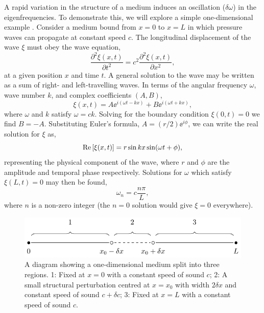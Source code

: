 A rapid variation in the structure of a medium induces an oscillation (\(\delta\omega\)) in the eigenfrequencies. To demonstrate this, we will explore a simple one-dimensional example \citep[e.g][]{Verner2005}. Consider a medium bound from \(x=0\) to \(x=L\) in which pressure waves can propagate at constant speed \(c\). The longitudinal displacement of the wave \(\xi\) must obey the wave equation,
%
\begin{equation}
    \frac{\partial^2\xi(x, t)}{\partial t^2} = c^2 \frac{\partial^2\xi(x, t)}{\partial x^2},
\end{equation}
%
at a given position \(x\) and time \(t\). A general solution to the wave may be written as a sum of right- and left-travelling waves. In terms of the angular frequency \(\omega\), wave number \(k\), and complex coefficients \((A, B)\),
%
\begin{equation}
    \xi(x, t) = A \ee^{i (\omega t - k x)} + B \ee^{i (\omega t + k x)},
\end{equation}
%
where \(\omega\) and \(k\) satisfy \(\omega = c k\). Solving for the boundary condition \(\xi(0, t) = 0\) we find \(B = - A\). Substituting Euler's formula, \(A = (r/2) \ee^{i\phi}\), we can write the real solution for \(\xi\) as,
%
\begin{equation}
    {\mathrm{Re}}\left[\xi(x, t)\right] = r \sin k x \sin(\omega t + \phi),
\end{equation}
%
representing the physical component of the wave, where \(r\) and \(\phi\) are the amplitude and temporal phase respectively. Solutions for \(\omega\) which satisfy \(\xi(L, t)=0\) may then be found,
%
\begin{equation}
    \omega_n = c \frac{n \pi}{L}, \label{eq:omega-n}
\end{equation}
%
where \(n\) is a non-zero integer (the \(n=0\) solution would give \(\xi=0\) everywhere).

\begin{figure}[!tb]
    \centering
    \includegraphics{figures/glitch-1d-example-diagram.pdf}
    \caption[A diagram showing a one-dimensional medium with a small structural perturbation.]{A diagram showing a one-dimensional medium split into three regions. 1: Fixed at \(x=0\) with a constant speed of sound \(c\); 2: A small structural perturbation centred at \(x=x_0\) with width \(2\delta x\) and constant speed of sound \(c + \delta c\); 3: Fixed at \(x=L\) with a constant speed of sound \(c\).}
    \label{fig:1d-diagram}
\end{figure}

